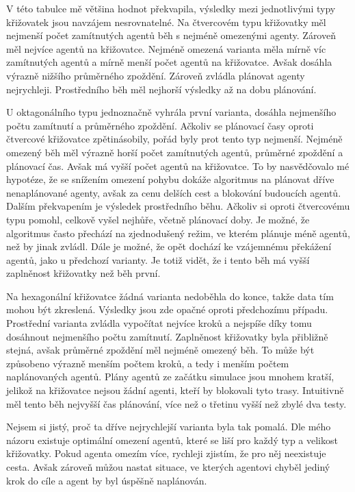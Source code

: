 V této tabulce mě většina hodnot překvapila, výsledky mezi jednotlivými typy křižovatek jsou navzájem nesrovnatelné.
Na čtvercovém typu křižovatky měl nejmenší počet zamítnutých agentů běh s nejméně omezenými agenty.
Zároveň měl nejvíce agentů na křižovatce.
Nejméně omezená varianta měla mírně víc zamítnutých agentů a mírně menší počet agentů na křižovatce.
Avšak dosáhla výrazně nižšího průměrného zpoždění.
Zároveň zvládla plánovat agenty nejrychleji.
Prostředního běh měl nejhorší výsledky až na dobu plánování.

U oktagonálního typu jednoznačně vyhrála první varianta,
dosáhla nejmenšího počtu zamítnutí a průměrného zpoždění.
Ačkoliv se plánovací časy oproti čtvercové křižovatce zpětinásobily, pořád byly prot tento typ nejmenší.
Nejméně omezený běh měl výrazně horší počet zamítnutých agentů, průměrné zpoždění a plánovací čas.
Avšak má vyšší počet agentů na křižovatce.
To by nasvědčovalo mé hypotéze, že se snížením omezení pohybu dokáže algoritmus na plánovat dříve nenaplánované agenty,
avšak za cenu delších cest a blokování budoucích agentů.
Dalším překvapením je výsledek prostředního běhu.
Ačkoliv si oproti čtvercovému typu pomohl, celkově vyšel nejhůře, včetně plánovací doby.
Je možné, že algoritmus často přechází na zjednodušený režim, ve kterém plánuje méně agentů, než by jinak zvládl.
Dále je možné, že opět dochází ke vzájemnému překážení agentů, jako u předchozí varianty.
Je totiž vidět, že i tento běh má vyšší zaplněnost křižovatky než běh první.

Na hexagonální křižovatce žádná varianta nedoběhla do konce, takže data tím mohou být zkreslená.
Výsledky jsou zde opačné oproti předchozímu případu.
Prostřední varianta zvládla vypočítat nejvíce kroků a nejspíše díky tomu dosáhnout nejmenšího počtu zamítnutí.
Zaplněnost křižovatky byla přibližně stejná, avšak průměrné zpoždění měl nejméně omezený běh.
To může být způsobeno výrazně menším počtem kroků, a tedy i menším počtem naplánovaných agentů.
Plány agentů ze začátku simulace jsou mnohem kratší,
jelikož na křižovatce nejsou žádní agenti, kteří by blokovali tyto trasy.
Intuitivně měl tento běh nejvyšší čas plánování, více než o třetinu vyšší než zbylé dva testy.

Nejsem si jistý, proč ta dříve nejrychlejší varianta byla tak pomalá.
Dle mého názoru existuje optimální omezení agentů, které se liší pro každý typ a velikost křižovatky.
Pokud agenta omezím více, rychleji zjistím, že pro něj neexistuje cesta.
Avšak zároveň můžou nastat situace, ve kterých agentovi chyběl jediný krok do cíle
a agent by byl úspěšně naplánován.

